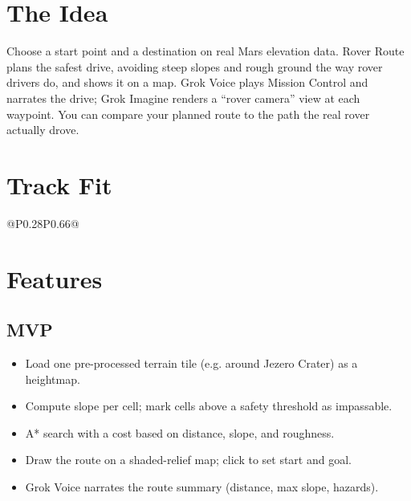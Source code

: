 \documentclass[11pt]{article}
\begin{document}

\section{The Idea}
Choose a start point and a destination on real Mars elevation data. Rover Route
plans the safest drive, avoiding steep slopes and rough ground the way rover
drivers do, and shows it on a map. Grok Voice plays Mission Control and narrates
the drive; Grok Imagine renders a ``rover camera'' view at each waypoint. You can
compare your planned route to the path the real rover actually drove.

\section{Track Fit}
\begin{tabular}{@{}P{0.28\textwidth}P{0.66\textwidth}@{}}
\toprule
{}
\bottomrule
\end{tabular}

\section{Features}
\subsection{MVP}
\begin{itemize}
  \item Load one pre-processed terrain tile (e.g. around Jezero Crater) as a heightmap.
  \item Compute slope per cell; mark cells above a safety threshold as impassable.
  \item A* search with a cost based on distance, slope, and roughness.
  \item Draw the route on a shaded-relief map; click to set start and goal.
  \item Grok Voice narrates the route summary (distance, max slope, hazards).
\end{itemize}
\end{document}
